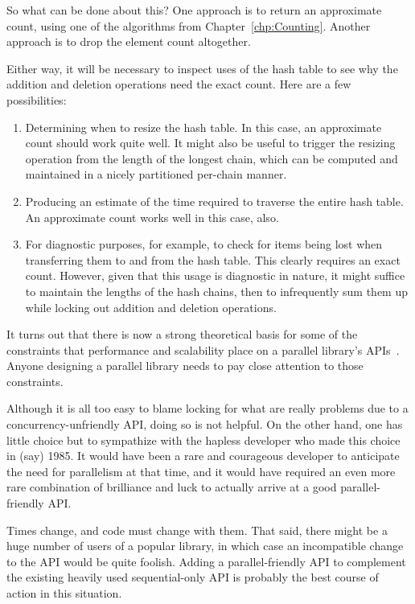 So what can be done about this?
One approach is to return an approximate count, using one of the algorithms
from Chapter~\ref{chp:Counting}.
Another approach is to drop the element count altogether.

Either way, it will be necessary to inspect uses of the hash table to see
why the addition and deletion operations need the exact count.
Here are a few possibilities:

\begin{enumerate}
\item	Determining when to resize the hash table.
	In this case, an approximate count should work quite well.
	It might also be useful to trigger the resizing operation from
	the length of the longest chain, which can be computed and
	maintained in a nicely partitioned per-chain manner.
\item	Producing an estimate of the time required to traverse the
	entire hash table.
	An approximate count works well in this case, also.
\item	For diagnostic purposes, for example, to check for items being
	lost when transferring them to and from the hash table.
	This clearly requires an exact count.
	However, given that this usage is diagnostic in nature, it might
	suffice to maintain the lengths of the hash chains, then to
	infrequently sum them
	up while locking out addition and deletion operations.
\end{enumerate}

It turns out that there is now a strong theoretical basis for some of the
constraints that performance and scalability place on a parallel library's
APIs~\cite{HagitAttiya2011LawsOfOrder,Attiya:2011:LOE:1925844.1926442,PaulEMcKenney2011SNC}.
Anyone designing a parallel library needs to pay close attention to
those constraints.

Although it is all too easy to blame locking for what are really problems
due to a concurrency-unfriendly API, doing so is not helpful.
On the other hand, one has little choice but to sympathize with the
hapless developer who made this choice in (say) 1985.
It would have been a rare and courageous developer to anticipate the
need for parallelism at that time, and it would have required an
even more rare combination of brilliance and luck to actually arrive
at a good parallel-friendly API.

Times change, and code must change with them.
That said, there might be a huge number of users of a popular library,
in which case an incompatible change to the API would be quite foolish.
Adding a parallel-friendly API to complement the existing heavily used
sequential-only API is probably the best course of action in this
situation.

